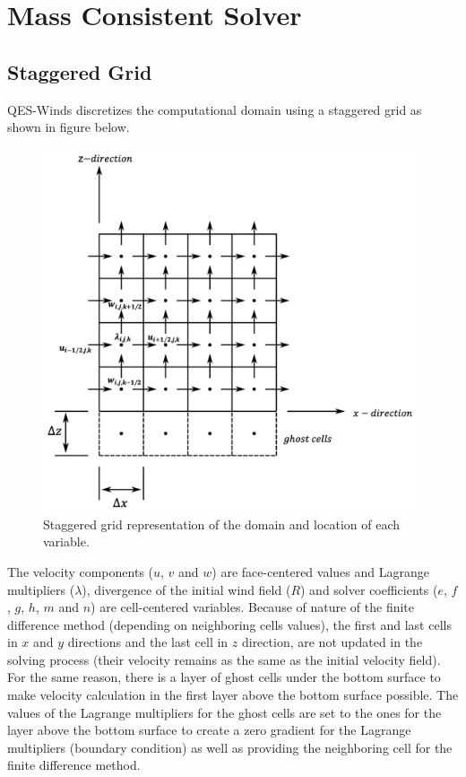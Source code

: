 \section{Mass Consistent Solver}

\subsection{Staggered Grid}

QES-Winds discretizes the computational domain using a staggered grid as shown in figure below.

\begin{figure}[h!]
\includegraphics[width=11cm]{Images/staggered_grid_full.png}
\caption{Staggered grid representation of the domain and location of each variable.}
\end{figure}

The velocity components ($u$, $v$ and $w$) are face-centered values and Lagrange multipliers ($\lambda$), divergence of the initial wind field ($R$) and solver coefficients ($e$, $f$, $g$, $h$, $m$ and $n$) are cell-centered variables. Because of nature of the finite difference method (depending on neighboring cells values), the first and last cells in $x$ and $y$ directions and the last cell in $z$ direction, are not updated in the solving process (their velocity remains as the same as the initial velocity field). For the same reason, there is a layer of ghost cells under the bottom surface to make velocity calculation in the first layer above the bottom surface possible. The values of the Lagrange multipliers for the ghost cells are set to the ones for the layer above the bottom surface to create a zero gradient for the Lagrange multipliers (boundary condition) as well as providing the neighboring cell for the finite difference method.

